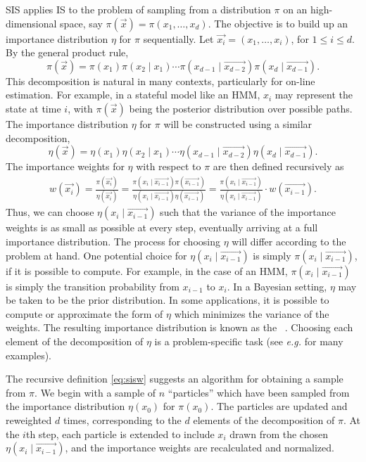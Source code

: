 \gls{SIS} applies \gls{IS} to the problem of sampling from a distribution $\pi$ 
on an high-dimensional space, say $\pi(\vec{x}) = \pi(x_1, \ldots, x_d)$. The
objective is to build up an importance distribution $\eta$ for $\pi$
sequentially. Let $\vec{x_i} = (x_1, \ldots, x_i)$, for $1 \leq i \leq d$. By
the general product rule,
\[
  \pi(\vec{x}) 
  = \pi(x_1) \pi(x_2 \mid x_1) \cdots
    \pi(x_{d-1} \mid \vec{x_{d-2}}) \pi(x_d \mid \vec{x_{d-1}}).
\]
This decomposition is natural in many contexts, particularly for on-line
estimation. For example, in a stateful model like an \gls{HMM}, $x_i$ may
represent the state at time $i$, with $\pi(\vec{x})$ being the posterior
distribution over possible paths. The importance distribution $\eta$ for $\pi$
will be constructed using a similar decomposition,
\[
  \eta(\vec{x}) 
  = \eta(x_1) \eta(x_2 \mid x_1) \cdots
    \eta(x_{d-1} \mid \vec{x_{d-2}}) \eta(x_d \mid \vec{x_{d-1}}).
\]
The importance weights for $\eta$ with respect to $\pi$ are then defined
recursively as
\begin{align}
  \label{eq:sisw}
  w(\vec{x_i}) = \frac{\pi(\vec{x_i})}{\eta(\vec{x_i})}
  = \frac{\pi(x_i \mid \vec{x_{i-1}})\pi(\vec{x_{i-1}})}
         {\eta(x_i \mid \vec{x_{i-1}})\eta(\vec{x_{i-1}})}
  = \frac{\pi(x_i \mid \vec{x_{i-1}})}
         {\eta(x_i \mid \vec{x_{i-1}})}\cdot w(\vec{x_{i-1}}).
\end{align}
Thus, we can choose $\eta(x_i \mid \vec{x_{i-1}})$ such that the variance of
the importance weights is as small as possible at every step, eventually
arriving at a full importance distribution. The process for choosing $\eta$
will differ according to the problem at hand. One potential choice for
$\eta(x_i \mid \vec{x_{i-1}})$ is simply $\pi(x_i \mid \vec{x_{i-1}})$, if it
is possible to compute. For example, in the case of an \gls{HMM}, $\pi(x_i \mid
\vec{x_{i-1}})$ is simply the transition probability from $x_{i-1}$ to $x_i$.
In a Bayesian setting, $\eta$ may be taken to be the prior distribution. In
some applications, it is possible to compute or approximate the form of $\eta$
which minimizes the variance of the weights. The resulting importance
distribution is known as the ~\autocite{cappe2007overview}. Choosing each element of the
decomposition of $\eta$ is a problem-specific task (see \textit{e.g.}
\autocite{smith2013sequential,liu2008monte} for many examples).

The recursive definition \cref{eq:sisw} suggests an algorithm for obtaining a
sample from $\pi$. We begin with a sample of $n$ ``particles'' which have been
sampled from the importance distribution $\eta(x_0)$ for $\pi(x_0)$. The
particles are updated and reweighted $d$ times, corresponding to the $d$
elements of the decomposition of $\pi$. At the $i$th step, each particle is
extended to include $x_i$ drawn from the chosen $\eta(x_i \mid \vec{x_{i-1}})$,
and the importance weights are recalculated and normalized. 

